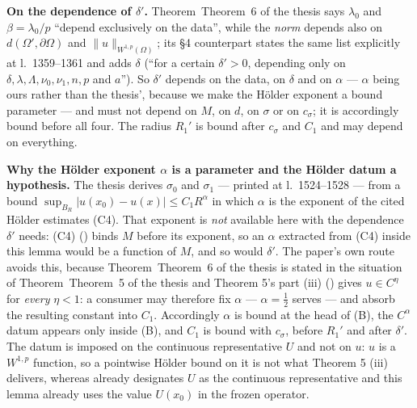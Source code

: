 \begin{lemma}
\medskip
\noindent\textbf{On the dependence of $\delta'$.}  Theorem~Theorem~6 of the thesis says
$\lambda_0$ and $\beta=\lambda_0/p$ ``depend exclusively on the data'', while
the \emph{norm} depends also on $d(\Omega',\partial\Omega)$ and
$\|u\|_{W^{1,p}(\Omega)}$; its \S4 counterpart states the same list explicitly
at l.~1359--1361 and adds $\delta$ (``for a certain $\delta'>0$, depending only
on $\delta,\lambda,\Lambda,\nu_0,\nu_1,n,p$ and $a$'').  So $\delta'$ depends on
the data, on $\delta$ and on $\alpha$ --- $\alpha$ being ours rather than the
thesis', because we make the H\"older exponent a bound parameter --- and must
not depend on $M$, on $d$, on $\sigma$ or on $c_\sigma$; it is accordingly bound
before all four.  The radius $R_1'$ is bound after $c_\sigma$ and $C_1$ and may
depend on everything.

\medskip
\noindent\textbf{Why the H\"older exponent $\alpha$ is a parameter and the
H\"older datum a hypothesis.}  The thesis derives $\sigma_0$ and $\sigma_1$ ---
printed at l.~1524--1528 --- from a bound
$\sup_{B_R}|u(x_0)-u(x)|\le C_1R^{\alpha}$ in which $\alpha$ is the exponent of
the cited H\"older estimates (C4).  That exponent is \emph{not} available here
with the dependence $\delta'$ needs: (C4) ()
binds $M$ before its exponent, so an $\alpha$ extracted from (C4) inside this
lemma would be a function of $M$, and so would $\delta'$.  The paper's own route
avoids this, because Theorem~Theorem~6 of the thesis is stated in the situation of
Theorem~Theorem~5 of the thesis and Theorem 5's part (iii)
() gives $u\in C^\eta$ for \emph{every}
$\eta<1$: a consumer may therefore fix $\alpha$ --- $\alpha=\tfrac12$ serves ---
and absorb the resulting constant into $C_1$.  Accordingly $\alpha$ is bound at
the head of (B), the $C^\alpha$ datum appears only inside (B), and $C_1$ is
bound with $c_\sigma$, before $R_1'$ and after $\delta'$.  The datum is imposed
on the continuous representative $U$ and not on $u$: $u$ is a $W^{1,p}$
function, so a pointwise H\"older bound on it is not what Theorem 5 (iii)
delivers, whereas  already designates $U$ as the
continuous representative and this lemma already uses the value $U(x_0)$ in the
frozen operator.


\end{lemma}
